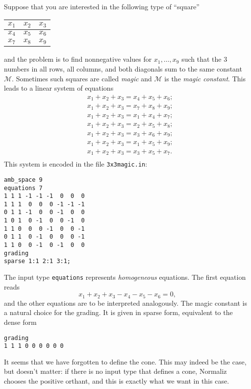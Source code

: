 \documentclass[12pt,a4paper]{scrartcl}
\theoremstyle{definition}
\def\ttt{\texttt}
\begin{document}
Suppose that you are interested in the following type of ``square''
\begin{center}
	\begin{tabular}{|l|l|l|}
		\hline
		$x_1$ & $x_2$ & $x_3$\\
		\hline
		$x_4$ & $x_5$ & $x_6$\\
		\hline
		$x_7$ & $x_8$ & $x_9$\\
		\hline
	\end{tabular}
\end{center}
and the problem is to find nonnegative values for $x_1,\dots,x_9$
such that the 3 numbers in all rows, all columns, and both
diagonals sum to the same constant $\mathcal{M}$. Sometimes
such squares are called \emph{magic} and $\mathcal M$ is the
\emph{magic constant}. This leads to a linear system of
equations
\begin{align*}
& x_1+x_2+x_3=x_4+x_5+x_6;\\
& x_1+x_2+x_3=x_7+x_8+x_9;\\
& x_1+x_2+x_3=x_1+x_4+x_7;\\
& x_1+x_2+x_3=x_2+x_5+x_8;\\
& x_1+x_2+x_3=x_3+x_6+x_9;\\
& x_1+x_2+x_3=x_1+x_5+x_9;\\
& x_1+x_2+x_3=x_3+x_5+x_7.\\
\end{align*}
This system is encoded in the file
\ttt{3x3magic.in}:
\begin{Verbatim}
amb_space 9
equations 7
1 1 1 -1 -1 -1  0  0  0
1 1 1  0  0  0 -1 -1 -1
0 1 1 -1  0  0 -1  0  0
1 0 1  0 -1  0  0 -1  0
1 1 0  0  0 -1  0  0 -1
0 1 1  0 -1  0  0  0 -1
1 1 0  0 -1  0 -1  0  0
grading
sparse 1:1 2:1 3:1;
\end{Verbatim}

The input type \verb|equations| represents \emph{homogeneous} equations. The first equation reads
$$
x_1+x_2+x_3-x_4-x_5-x_6=0,
$$
and the other equations are to be interpreted analogously. The magic constant is a natural choice for the grading. It is given in sparse form, equivalent to the dense form
\begin{Verbatim}
grading
1 1 1 0 0 0 0 0 0
\end{Verbatim}

It seems that we have forgotten to define the cone. This may indeed be the case, but doesn't matter: if there is no input type that defines a cone, Normaliz chooses the positive orthant, and this is exactly what we want in this case.
\end{document}
